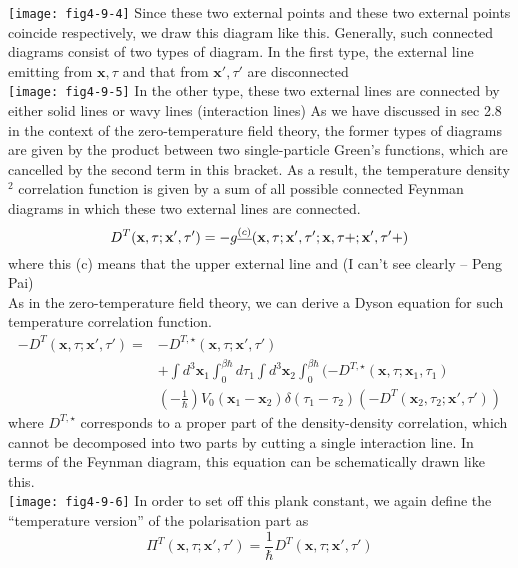 \texttt{[image: fig4-9-4]}
 Since these two external points and these two external points coincide respectively, we draw this diagram like this.
 Generally, such connected diagrams consist of two types of diagram.
 In the first type, the external line emitting from $\mathbf x,\tau$ and that from $\mathbf x',\tau'$ are disconnected\\
\texttt{[image: fig4-9-5]}
 In the other type, these two external lines are connected by either solid lines or wavy lines (interaction lines)
 As we have discussed in sec 2.8 in the context of the zero-temperature field theory, the former types of diagrams are given by the product between two single-particle Green's functions, which are cancelled by the second term in this bracket.
 As a result, the temperature density$^2$ correlation function is given by a sum of all possible connected Feynman diagrams in which these two external lines are connected.
\begin{equation}
D^T(\mathbf x,\tau;\mathbf x',\tau')=-g^{\uline{(c)}}(\mathbf x,\tau;\mathbf x',\tau';\mathbf x,\tau+;\mathbf x',\tau'+)
\end{equation}
where this (c) means that the upper external line and (I can't see clearly -- Peng Pai)\\
As in the zero-temperature field theory, we can derive a Dyson equation for such temperature correlation function.
\begin{equation}
\begin{aligned}
-D^{T}(\mathbf x,\tau;\mathbf x',\tau')=&-D^{T,\star}(\mathbf x,\tau;\mathbf x',\tau')\\
&+\int d^3\mathbf x_1 \int_0^{\beta\hbar}d\tau_1\int d^3\mathbf x_2\int _0^{\beta\hbar}(-D^{T,\star}(\mathbf x,\tau;\mathbf x_1,\tau_1)\\
&\left(-\frac{1}{\hbar}\right)V_0(\mathbf x_1-\mathbf x_2)\delta(\tau_1-\tau_2)\left(-D^T(\mathbf x_2,\tau_2;\mathbf x',\tau')\right)
\end{aligned}
\end{equation}
where $D^{T,\star}$ corresponds to a proper part of the density-density correlation, which cannot be decomposed into two parts by cutting a single interaction line.
 In terms of the Feynman diagram, this equation can be schematically drawn like this.\\
\texttt{[image: fig4-9-6]}
 In order to set off this plank constant, we again define the ``temperature version'' of the polarisation part as
\begin{equation}
\Pi^T(\mathbf x,\tau;\mathbf x',\tau')=\frac{1}{\hbar}D^T(\mathbf x,\tau;\mathbf x',\tau')
\end{equation} 
